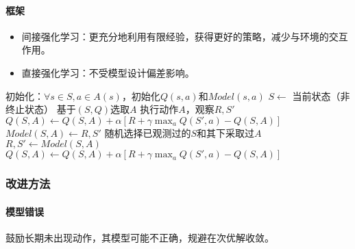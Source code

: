 \documentclass[
12pt, %
a4paper, 
oneside, %
headinclude,footinclude, %
]{scrartcl}
\begin{document}
\paragraph{框架}
\begin{itemize}
\item 间接强化学习：更充分地利用有限经验，获得更好的策略，减少与环境的交互作用。
\item 直接强化学习：不受模型设计偏差影响。
\end{itemize}
\begin{myalgorithm}[表格型Dyna-Q]
\State 初始化：$ \forall s \in S, a \in A(s) $，初始化$ Q(s, a) $和$ Model(s, a) $
\Loop
\State $ S \gets $ 当前状态（非终止状态）
\State 基于$ (S, Q) $选取$ A $ 
\State 执行动作$ A $，观察$ R,S' $
\State $ Q(S, A) \gets Q(S, A) + \alpha[R + \gamma \max_a Q(S', a) - Q(S, A)] $ 
\State $ Model(S, A) \gets R,S' $
 
\State 随机选择已观测过的$ S $和其下采取过$ A $
\State $ R,S' \gets Model(S, A) $ 
\State $ Q(S, A) \gets Q(S, A) + \alpha[R + \gamma \max_a Q(S', a) - Q(S, A)] $ 
\EndFor
\EndLoop
\end{myalgorithm}
\subsubsection{改进方法}
\paragraph{模型错误}
鼓励长期未出现动作，其模型可能不正确，规避在次优解收敛。
\end{document}
